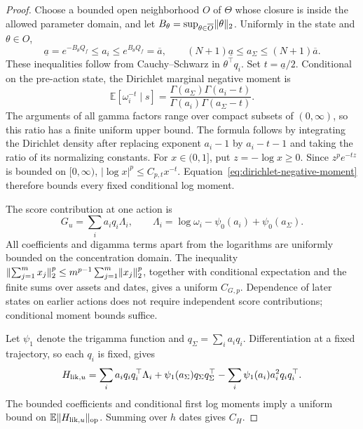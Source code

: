 \documentclass[11pt]{article}
\newcommand{\E}{\mathbb E}
\newcommand{\1}{\mathbf 1}
\newcommand{\op}{\mathrm{op}}
\DeclarePairedDelimiter{\norm}{\lVert}{\rVert}
\begin{document}
\begin{proof}
Choose a bounded open neighborhood $O$ of $\Theta$ whose closure is inside the allowed parameter domain, and let $B_\theta=\sup_{\theta\in\overline O}\norm\theta_2$. Uniformly in the state and $\theta\in O$,
\[
 \underline a=e^{-B_\theta Q_f}\le a_i\le e^{B_\theta Q_f}=\overline a,
 \qquad (N+1)\underline a\le a_\Sigma\le(N+1)\overline a.
\]
These inequalities follow from Cauchy--Schwarz in $\theta^\top q_i$. Set $t=\underline a/2$. Conditional on the pre-action state, the Dirichlet marginal negative moment is
\begin{equation}\label{eq:dirichlet-negative-moment}
 \E[\omega_i^{-t}\mid s]
 =\frac{\Gamma(a_\Sigma)\Gamma(a_i-t)}{\Gamma(a_i)\Gamma(a_\Sigma-t)}.
\end{equation}
The arguments of all gamma factors range over compact subsets of $(0,\infty)$, so this ratio has a finite uniform upper bound. The formula follows by integrating the Dirichlet density after replacing exponent $a_i-1$ by $a_i-t-1$ and taking the ratio of its normalizing constants. For $x\in(0,1]$, put $z=-\log x\ge0$. Since $z^p e^{-tz}$ is bounded on $[0,\infty)$, $|\log x|^p\le C_{p,t}x^{-t}$. Equation~\eqref{eq:dirichlet-negative-moment} therefore bounds every fixed conditional log moment.

The score contribution at one action is
\[
 G_u=\sum_i a_iq_i \Lambda_i,\qquad
 \Lambda_i=\log\omega_i-\psi_0(a_i)+\psi_0(a_\Sigma).
\]
All coefficients and digamma terms apart from the logarithms are uniformly bounded on the concentration domain. The inequality
$\norm{\sum_{j=1}^m x_j}_2^p\le m^{p-1}\sum_{j=1}^m\norm{x_j}_2^p$, together with conditional expectation and the finite sums over assets and dates, gives a uniform $C_{G,p}$. Dependence of later states on earlier actions does not require independent score contributions; conditional moment bounds suffice.

Let $\psi_1$ denote the trigamma function and $q_\Sigma=\sum_i a_iq_i$. Differentiation at a fixed trajectory, so each $q_i$ is fixed, gives
\begin{equation}\label{eq:dirichlet-hessian}
 H_{{\rm lik},u}=\sum_i a_iq_iq_i^\top \Lambda_i
 +\psi_1(a_\Sigma)q_\Sigma q_\Sigma^\top
 -\sum_i\psi_1(a_i)a_i^2q_iq_i^\top.
\end{equation}
The bounded coefficients and conditional first log moments imply a uniform bound on $\E\norm{H_{{\rm lik},u}}_{\op}$. Summing over $h$ dates gives $C_H$.


\end{proof}
\end{document}
